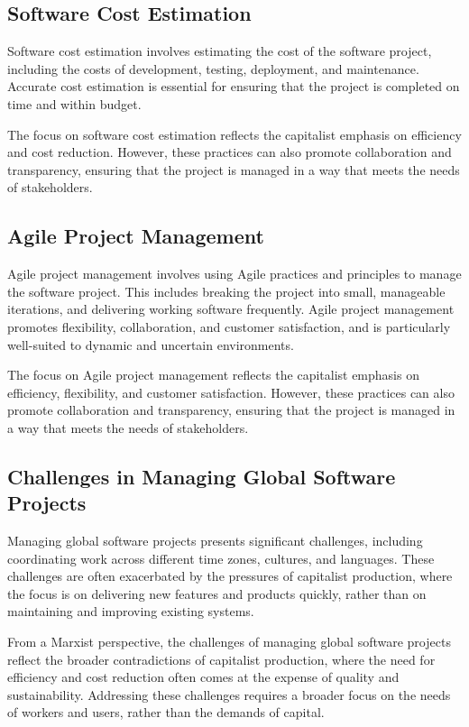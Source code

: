 \begin{refsection}
\begin{multicols}{2}
{\subsection{Software Cost Estimation}

Software cost estimation involves estimating the cost of the software project, including the costs of development, testing, deployment, and maintenance. Accurate cost estimation is essential for ensuring that the project is completed on time and within budget.

The focus on software cost estimation reflects the capitalist emphasis on efficiency and cost reduction. However, these practices can also promote collaboration and transparency, ensuring that the project is managed in a way that meets the needs of stakeholders.

\subsection{Agile Project Management}

Agile project management involves using Agile practices and principles to manage the software project. This includes breaking the project into small, manageable iterations, and delivering working software frequently. Agile project management promotes flexibility, collaboration, and customer satisfaction, and is particularly well-suited to dynamic and uncertain environments.

The focus on Agile project management reflects the capitalist emphasis on efficiency, flexibility, and customer satisfaction. However, these practices can also promote collaboration and transparency, ensuring that the project is managed in a way that meets the needs of stakeholders.

\subsection{Challenges in Managing Global Software Projects}

Managing global software projects presents significant challenges, including coordinating work across different time zones, cultures, and languages. These challenges are often exacerbated by the pressures of capitalist production, where the focus is on delivering new features and products quickly, rather than on maintaining and improving existing systems.

From a Marxist perspective, the challenges of managing global software projects reflect the broader contradictions of capitalist production, where the need for efficiency and cost reduction often comes at the expense of quality and sustainability. Addressing these challenges requires a broader focus on the needs of workers and users, rather than the demands of capital.

}
\end{multicols}
\end{refsection}
